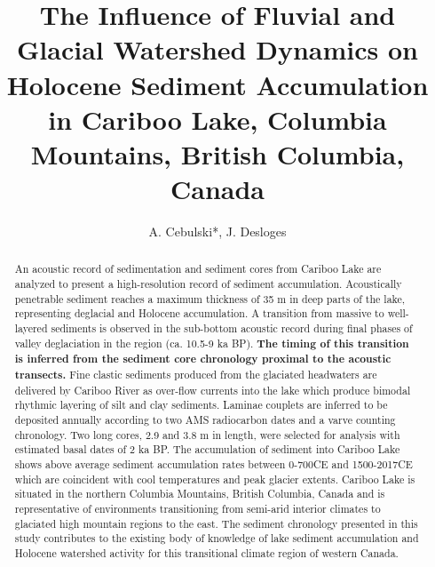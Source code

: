 \documentclass[Royal,times,doublespace,sageh]{sagej}
\begin{document}

\title{The Influence of Fluvial and Glacial Watershed Dynamics on
Holocene Sediment Accumulation in Cariboo Lake, Columbia Mountains,
British Columbia, Canada}


\author{A. Cebulski*, J. Desloges}




\begin{abstract}
An acoustic record of sedimentation and sediment cores from Cariboo Lake
are analyzed to present a high-resolution record of sediment
accumulation. Acoustically penetrable sediment reaches a maximum
thickness of 35 m in deep parts of the lake, representing deglacial and
Holocene accumulation. A transition from massive to well-layered
sediments is observed in the sub-bottom acoustic record during final
phases of valley deglaciation in the region (ca. 10.5-9 ka BP).
\textbf{The timing of this transition is inferred from the sediment core
chronology proximal to the acoustic transects.} Fine clastic sediments
produced from the glaciated headwaters are delivered by Cariboo River as
over-flow currents into the lake which produce bimodal rhythmic layering
of silt and clay sediments. Laminae couplets are inferred to be
deposited annually according to two AMS radiocarbon dates and a varve
counting chronology. Two long cores, 2.9 and 3.8 m in length, were
selected for analysis with estimated basal dates of 2 ka BP. The
accumulation of sediment into Cariboo Lake shows above average sediment
accumulation rates between 0-700CE and 1500-2017CE which are coincident
with cool temperatures and peak glacier extents. Cariboo Lake is
situated in the northern Columbia Mountains, British Columbia, Canada
and is representative of environments transitioning from semi-arid
interior climates to glaciated high mountain regions to the east. The
sediment chronology presented in this study contributes to the existing
body of knowledge of lake sediment accumulation and Holocene watershed
activity for this transitional climate region of western Canada.
\end{abstract}
\end{document}

